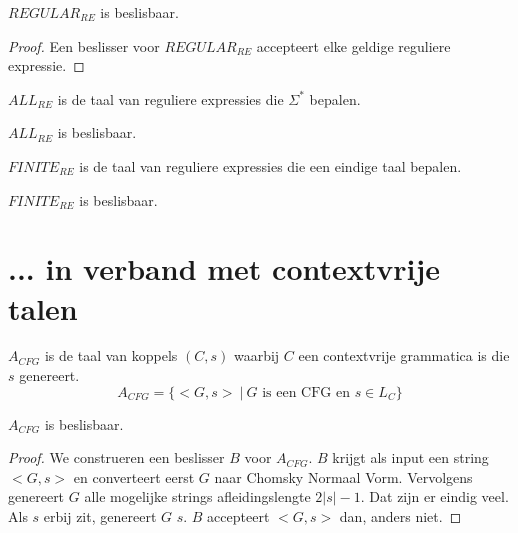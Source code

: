 \documentclass[main.tex]{subfiles}
\begin{document}
\begin{st}
  \label{st:regular-re-besl}
  $REGULAR_{RE}$ is beslisbaar.

  \begin{proof}
    Een beslisser voor $REGULAR_{RE}$ accepteert elke geldige reguliere expressie. 
  \end{proof}
\end{st}

\begin{de}
  \label{de:all-re}
  $ALL_{RE}$ is de taal van reguliere expressies die $\Sigma^{*}$ bepalen.
\end{de}

\begin{st}
  \label{st:all-re-besl}
  $ALL_{RE}$ is beslisbaar.
\end{st}

\begin{de}
  \label{de:finite-re}
  $FINITE_{RE}$ is de taal van reguliere expressies die een eindige taal bepalen.
\end{de}

\begin{st}
  \label{st:finite-re-besl}
  $FINITE_{RE}$ is beslisbaar.
\end{st}

\section{... in verband met contextvrije talen}
\label{sec:verb-met-cont}

\begin{de}
  \label{de:a-cfg}
  $A_{CFG}$ is de taal van koppels $(C,s)$ waarbij $C$ een contextvrije grammatica is die $s$ genereert.
  \[ A_{CFG} = \{ <G,s> \ |\ G \text{ is een CFG en } s \in L_{C} \} \]
\end{de}

\begin{st}
  \label{st:a-cfg-besl}
  $A_{CFG}$ is beslisbaar.

  \begin{proof}
    We construeren een beslisser $B$ voor $A_{CFG}$.
    $B$ krijgt als input een string $<G,s>$ en converteert eerst $G$ naar Chomsky Normaal Vorm.
    Vervolgens genereert $G$ alle mogelijke strings afleidingslengte $2|s| - 1$.
    Dat zijn er eindig veel.
    Als $s$ erbij zit, genereert $G$ $s$.
    $B$ accepteert $<G,s>$ dan, anders niet.
  \end{proof}
\end{st}
\end{document}
